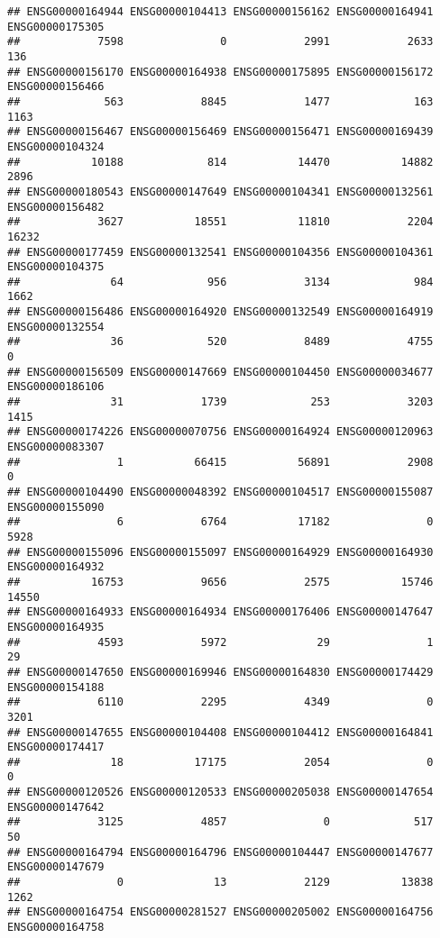 \documentclass[
]{article}
\begin{document}
\begin{verbatim}
## ENSG00000164944 ENSG00000104413 ENSG00000156162 ENSG00000164941 ENSG00000175305 
##            7598               0            2991            2633             136 
## ENSG00000156170 ENSG00000164938 ENSG00000175895 ENSG00000156172 ENSG00000156466 
##             563            8845            1477             163            1163 
## ENSG00000156467 ENSG00000156469 ENSG00000156471 ENSG00000169439 ENSG00000104324 
##           10188             814           14470           14882            2896 
## ENSG00000180543 ENSG00000147649 ENSG00000104341 ENSG00000132561 ENSG00000156482 
##            3627           18551           11810            2204           16232 
## ENSG00000177459 ENSG00000132541 ENSG00000104356 ENSG00000104361 ENSG00000104375 
##              64             956            3134             984            1662 
## ENSG00000156486 ENSG00000164920 ENSG00000132549 ENSG00000164919 ENSG00000132554 
##              36             520            8489            4755               0 
## ENSG00000156509 ENSG00000147669 ENSG00000104450 ENSG00000034677 ENSG00000186106 
##              31            1739             253            3203            1415 
## ENSG00000174226 ENSG00000070756 ENSG00000164924 ENSG00000120963 ENSG00000083307 
##               1           66415           56891            2908               0 
## ENSG00000104490 ENSG00000048392 ENSG00000104517 ENSG00000155087 ENSG00000155090 
##               6            6764           17182               0            5928 
## ENSG00000155096 ENSG00000155097 ENSG00000164929 ENSG00000164930 ENSG00000164932 
##           16753            9656            2575           15746           14550 
## ENSG00000164933 ENSG00000164934 ENSG00000176406 ENSG00000147647 ENSG00000164935 
##            4593            5972              29               1              29 
## ENSG00000147650 ENSG00000169946 ENSG00000164830 ENSG00000174429 ENSG00000154188 
##            6110            2295            4349               0            3201 
## ENSG00000147655 ENSG00000104408 ENSG00000104412 ENSG00000164841 ENSG00000174417 
##              18           17175            2054               0               0 
## ENSG00000120526 ENSG00000120533 ENSG00000205038 ENSG00000147654 ENSG00000147642 
##            3125            4857               0             517              50 
## ENSG00000164794 ENSG00000164796 ENSG00000104447 ENSG00000147677 ENSG00000147679 
##               0              13            2129           13838            1262 
## ENSG00000164754 ENSG00000281527 ENSG00000205002 ENSG00000164756 ENSG00000164758 

\end{verbatim}
\end{document}
